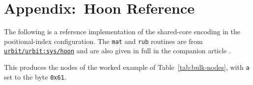 \documentclass[twoside]{article}
\begin{document}
\newpage
\section*{Appendix:\ Hoon Reference}

The following is a reference implementation of the shared-core encoding in the positional-index configuration.  The \texttt{mat} and \texttt{rub} routines are from \href{https://github.com/urbit/urbit}{\texttt{urbit/urbit:sys/hoon}} and are also given in full in the companion article \citep{ticlys2026noun}.

This produces the nodes of the worked example of Table~\ref{tab:bulk-nodes}, with \lstinline[style=inlinecode]{a} set to the byte \lstinline[style=inlinecode]{0x61}.

\end{document}
